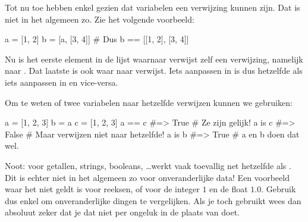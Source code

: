   Tot nu toe hebben enkel gezien dat variabelen een verwijzing kunnen zijn. Dat
  is niet in het algemeen zo. Zie het volgende voorbeeld:
  \begin{python}
    a = [1, 2]
    b = [a, [3, 4]] # Dus b == [[1, 2], [3, 4]]
  \end{python}
  Nu is het eerste element in de lijst waarnaar  verwijst zelf een
  verwijzing, namelijk naar \py{[1, 2]}. Dat laatste is ook waar  naar
  verwijst. Iets aanpassen in  is dus hetzelfde als iets aanpassen in
   en vice-versa.

  Om te weten of twee variabelen naar hetzelfde verwijzen kunnen we 
  gebruiken:
  \begin{python}
    a = [1, 2, 3]
    b = a
    c = [1, 2, 3]
    a == c    #=> True  # Ze zijn gelijk!
    a is c    #=> False # Maar verwijzen niet naar hetzelfde!
    a is b    #=> True  # a en b doen dat wel.
  \end{python}
  Noot: voor getallen, strings, booleans, \ldots werkt  vaak toevallig
  net hetzelfde als \py{==}. Dit is echter niet in het algemeen zo voor
  onveranderlijke data! Een voorbeeld waar het niet geldt is voor reeksen, of
  voor de integer $1$ en de float $1.0$. Gebruik dus enkel \py{==} om
  onveranderlijke dingen te vergelijken. Als je toch  gebruikt wees dan
  absoluut zeker dat je dat niet per ongeluk in de plaats van \py{==} doet.
